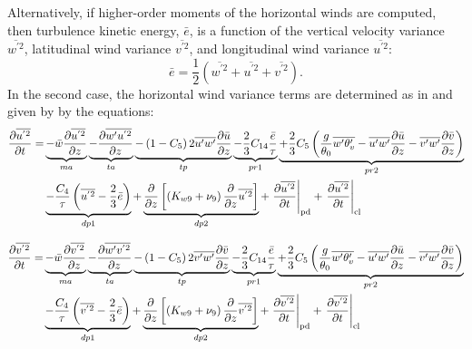 \documentclass[11pt,fleqn]{article}
\newcommand{\ptlder}[2]{\frac{\partial #1}{\partial #2}}
\begin{document}
Alternatively, if higher-order moments of the horizontal winds are computed, 
then turbulence kinetic energy, $\bar{e}$, is a function of the vertical 
velocity variance $\overline{w^{'2}}$, 
latitudinal wind variance $\overline{v^{'2}}$, and 
longitudinal wind variance $\overline{u^{'2}}$:
%
\begin{equation}
\label{eq_aniso_tke}
\bar{e} = \frac{1}{2} 
  \left( 
    \overline{w^{'2}}+\overline{u^{'2}}+\overline{v^{'2}}
  \right).
\end{equation}
%
In the second case, the horizontal wind variance terms are determined as in 
\citet{bougeault1981a} and given by by the equations:
%
\begin{equation}
\begin{split}
\label{eq_up2}
\ptlder{\overline{u^{'2}}}{t}
= & \underbrace{ - \bar{w}\ptlder{\overline{u^{'2}}}{z} }_{ma}
    \underbrace{ - \ptlder{\overline{w'u^{'2}}}{z} }_{ta}
    \underbrace{ - \left(1 - C_{5} \right) 2\overline{u'w'}\ptlder{\bar{u}}{z} }_{tp}
    \underbrace{ - \frac{2}{3} 
                  C_{14} \frac{\bar{e}}{\tau}
               }_{pr1}
    \underbrace{ + \frac{2}{3} C_{5}
      \left(
        \frac{g}{\theta_0} \overline{w'\theta'_v} 
        - \overline{u'w'}\ptlder{\bar{u}}{z} 
        - \overline{v'w'}\ptlder{\bar{v}}{z} 
      \right) }_{pr2} \\
  & \underbrace{ - \dfrac{C_4}{\tau} \left( \overline{u^{'2}} - \frac{2}{3} \bar{e} \right) }_{dp1}
    + \underbrace{ \ptlder{}{z} \left[ \left( K_{w9} + \nu_9 \right)
                          \ptlder{}{z} \overline{u^{'2}} 
                   \right] }_{dp2}
    + \left. \ptlder{\overline{u^{'2}}}{t} \right|_{\rm{pd}}
    + \left. \ptlder{\overline{u^{'2}}}{t} \right|_{\rm{cl}}
\end{split}
\end{equation}
%

%
\begin{equation}
\begin{split}
\label{eq_vp2}
\ptlder{\overline{v^{'2}}}{t}
= & \underbrace{ - \bar{w}\ptlder{\overline{v^{'2}}}{z} }_{ma}
    \underbrace{ - \ptlder{\overline{w'v^{'2}}}{z} }_{ta}
    \underbrace{ - \left(1 - C_{5} \right) 2\overline{v'w'}\ptlder{\bar{v}}{z} }_{tp}
    \underbrace{ - \frac{2}{3} 
                  C_{14} \frac{\bar{e}}{\tau}
               }_{pr1}
    \underbrace{ + \frac{2}{3} C_{5}
      \left(
        \frac{g}{\theta_0} \overline{w'\theta'_v} 
        - \overline{u'w'}\ptlder{\bar{u}}{z} 
        - \overline{v'w'}\ptlder{\bar{v}}{z} 
      \right) }_{pr2} \\
  & \underbrace{ - \dfrac{C_4}{\tau} \left( \overline{v^{'2}} - \frac{2}{3} \bar{e} \right) }_{dp1}
    + \underbrace{ \ptlder{}{z} \left[ \left( K_{w9} + \nu_9 \right)
                          \ptlder{}{z} \overline{v^{'2}} 
                   \right] }_{dp2}
    + \left. \ptlder{\overline{v^{'2}}}{t} \right|_{\rm{pd}}
    + \left. \ptlder{\overline{v^{'2}}}{t} \right|_{\rm{cl}}
\end{split}
\end{equation}
%
\end{document}
